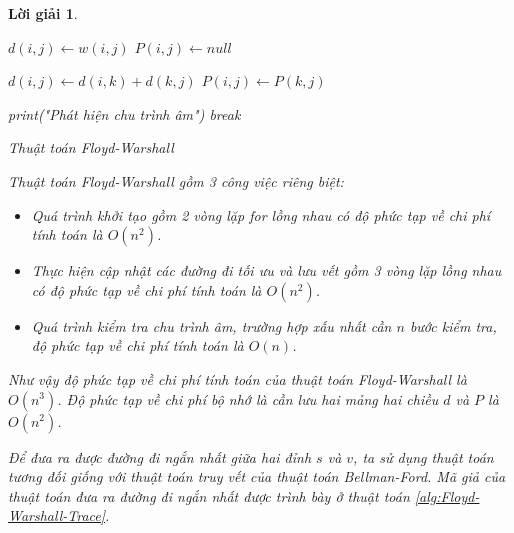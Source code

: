 \documentclass[14pt, a4paper]{article}
\theoremstyle{sltheorem}
\theoremstyle{soltheorem}
\newtheorem*{loigiai}{Lời giải}
\begin{document}
\begin{loigiai}
\begin{itemize}
\begin{itemize}
\begin{algorithm}[h!]
                     {
                         {
                            $d(i, j) \gets w(i, j)$\;
                             {
                                $P(i, j) \gets null$\;
                            } 
                        }
                    }

                     {
                         {
                             {
                                 {
                                    $d(i, j) \gets d(i, k) + d(k, j)$\;
                                    $P(i, j) \gets P(k, j)$\;
                                }
                            }
                        }
                    }

                     {
                         {
                            print("Phát hiện chu trình âm")\;
                            break\;
                        }
                    }
                    \;
                    \caption{Thuật toán Floyd-Warshall}
                    \label{alg:Floyd-Warshall}
                \end{algorithm}

                Thuật toán Floyd-Warshall gồm 3 công việc riêng biệt:
                \begin{itemize}
                    \item Quá trình khởi tạo gồm 2 vòng lặp for lồng nhau có độ phức tạp về chi phí tính toán là $O(n^2)$.
                    \item Thực hiện cập nhật các đường đi tối ưu và lưu vết gồm 3 vòng lặp lồng nhau có độ phức tạp về chi phí tính toán là $O(n^2)$.
                    \item Quá trình kiểm tra chu trình âm, trường hợp xấu nhất cần $n$ bước kiểm tra, độ phức tạp về chi phí tính toán là $O(n)$.
                \end{itemize}
                Như vậy độ phức tạp về chi phí tính toán của thuật toán Floyd-Warshall là $O(n^3)$.
                Độ phức tạp về chi phí bộ nhớ là cần lưu hai mảng hai chiều $d$ và $P$ là $O(n^2)$.

                Để đưa ra được đường đi ngắn nhất giữa hai đỉnh $s$ và $v$, ta sử dụng thuật toán tương đối giống với thuật toán truy vết của thuật toán Bellman-Ford.
                Mã giả của thuật toán đưa ra đường đi ngắn nhất được trình bày ở thuật toán \ref{alg:Floyd-Warshall-Trace}.


\end{itemize}
\end{itemize}
\end{loigiai}
\end{document}
